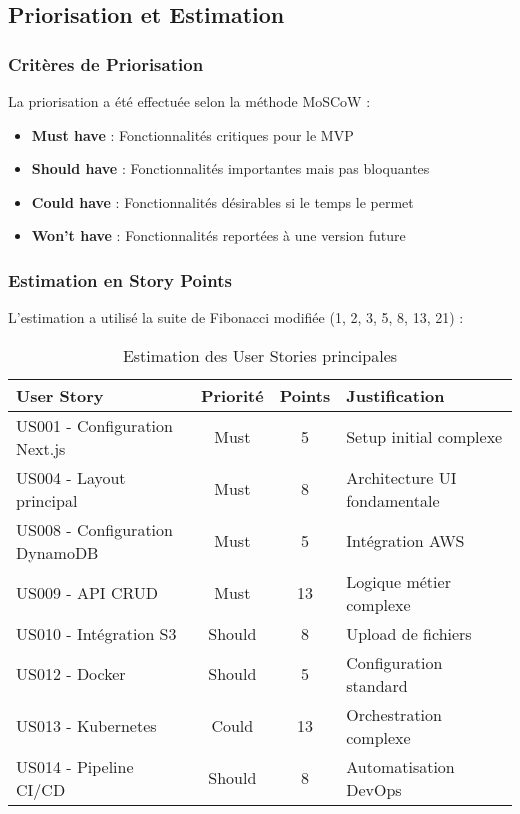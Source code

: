 \subsection{Priorisation et Estimation}

\subsubsection{Critères de Priorisation}

La priorisation a été effectuée selon la méthode MoSCoW :
\begin{itemize}
    \item \textbf{Must have} : Fonctionnalités critiques pour le MVP
    \item \textbf{Should have} : Fonctionnalités importantes mais pas bloquantes
    \item \textbf{Could have} : Fonctionnalités désirables si le temps le permet
    \item \textbf{Won't have} : Fonctionnalités reportées à une version future
\end{itemize}

\subsubsection{Estimation en Story Points}

L'estimation a utilisé la suite de Fibonacci modifiée (1, 2, 3, 5, 8, 13, 21) :

\begin{table}[H]
    \centering
    \begin{tabularx}{\textwidth}{|X|c|c|X|}
        \hline
        \textbf{User Story} & \textbf{Priorité} & \textbf{Points} & \textbf{Justification} \\
        \hline
        US001 - Configuration Next.js & Must & 5 & Setup initial complexe \\
        \hline
        US004 - Layout principal & Must & 8 & Architecture UI fondamentale \\
        \hline
        US008 - Configuration DynamoDB & Must & 5 & Intégration AWS \\
        \hline
        US009 - API CRUD & Must & 13 & Logique métier complexe \\
        \hline
        US010 - Intégration S3 & Should & 8 & Upload de fichiers \\
        \hline
        US012 - Docker & Should & 5 & Configuration standard \\
        \hline
        US013 - Kubernetes & Could & 13 & Orchestration complexe \\
        \hline
        US014 - Pipeline CI/CD & Should & 8 & Automatisation DevOps \\
        \hline
    \end{tabularx}
    \caption{Estimation des User Stories principales}
    \label{tab:user_stories_estimation}
\end{table}

